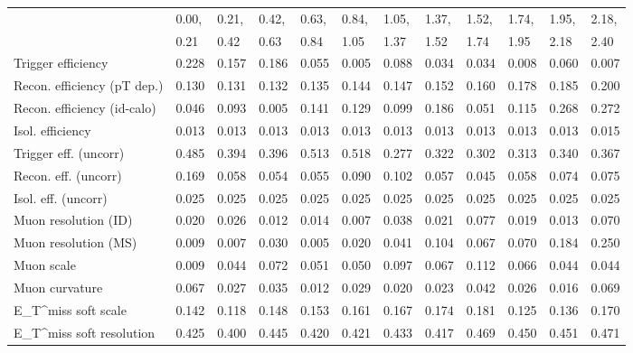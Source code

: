 \begin{tabular}{l|p{0.6cm}p{0.6cm}p{0.6cm}p{0.6cm}p{0.6cm}p{0.6cm}p{0.6cm}p{0.6cm}p{0.6cm}p{0.6cm}p{0.6cm}}
\hline
   & 0.00, & 0.21, & 0.42, & 0.63, & 0.84, & 1.05, & 1.37, & 1.52, & 1.74, & 1.95, & 2.18,  \\ 
   & 0.21 & 0.42 & 0.63 & 0.84 & 1.05 & 1.37 & 1.52 & 1.74 & 1.95 & 2.18 & 2.40  \\ 
\hline
Trigger efficiency                       & 0.228 & 0.157 & 0.186 & 0.055 & 0.005 & 0.088 & 0.034 & 0.034 & 0.008 & 0.060 & 0.007 \\
Recon. efficiency (pT dep.)              & 0.130 & 0.131 & 0.132 & 0.135 & 0.144 & 0.147 & 0.152 & 0.160 & 0.178 & 0.185 & 0.200 \\
Recon. efficiency (id-calo)              & 0.046 & 0.093 & 0.005 & 0.141 & 0.129 & 0.099 & 0.186 & 0.051 & 0.115 & 0.268 & 0.272 \\
Isol. efficiency                         & 0.013 & 0.013 & 0.013 & 0.013 & 0.013 & 0.013 & 0.013 & 0.013 & 0.013 & 0.013 & 0.015 \\
Trigger eff. (uncorr)                    & 0.485 & 0.394 & 0.396 & 0.513 & 0.518 & 0.277 & 0.322 & 0.302 & 0.313 & 0.340 & 0.367 \\
Recon. eff. (uncorr)                     & 0.169 & 0.058 & 0.054 & 0.055 & 0.090 & 0.102 & 0.057 & 0.045 & 0.058 & 0.074 & 0.075 \\
Isol. eff. (uncorr)                      & 0.025 & 0.025 & 0.025 & 0.025 & 0.025 & 0.025 & 0.025 & 0.025 & 0.025 & 0.025 & 0.025 \\
Muon resolution (ID)                     & 0.020 & 0.026 & 0.012 & 0.014 & 0.007 & 0.038 & 0.021 & 0.077 & 0.019 & 0.013 & 0.070 \\
Muon resolution (MS)                     & 0.009 & 0.007 & 0.030 & 0.005 & 0.020 & 0.041 & 0.104 & 0.067 & 0.070 & 0.184 & 0.250 \\
Muon scale                               & 0.009 & 0.044 & 0.072 & 0.051 & 0.050 & 0.097 & 0.067 & 0.112 & 0.066 & 0.044 & 0.044 \\
Muon curvature                           & 0.067 & 0.027 & 0.035 & 0.012 & 0.029 & 0.020 & 0.023 & 0.042 & 0.026 & 0.016 & 0.069 \\
E_{T}^{miss} soft scale                  & 0.142 & 0.118 & 0.148 & 0.153 & 0.161 & 0.167 & 0.174 & 0.181 & 0.125 & 0.136 & 0.170 \\
E_{T}^{miss} soft resolution             & 0.425 & 0.400 & 0.445 & 0.420 & 0.421 & 0.433 & 0.417 & 0.469 & 0.450 & 0.451 & 0.471 \\

\end{tabular}
